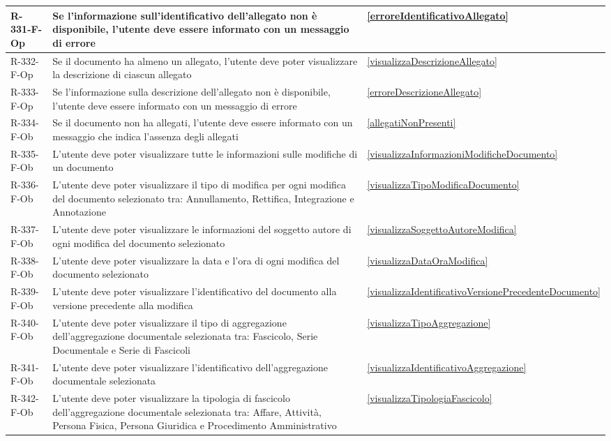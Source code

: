 \begin{longtable}{|p{2.5cm}|p{9.5cm}|p{2.5cm}|}
\hline
R-331-F-Op & Se l'informazione sull'identificativo dell'allegato non è disponibile, l'utente deve essere informato con un messaggio di errore & \ref{erroreIdentificativoAllegato} \\
\hline
R-332-F-Op & Se il documento ha almeno un allegato, l'utente deve poter visualizzare la descrizione di ciascun allegato & \ref{visualizzaDescrizioneAllegato} \\
\hline
R-333-F-Op & Se l'informazione sulla descrizione dell'allegato non è disponibile, l'utente deve essere informato con un messaggio di errore & \ref{erroreDescrizioneAllegato} \\
\hline
R-334-F-Ob & Se il documento non ha allegati, l'utente deve essere informato con un messaggio che indica l'assenza degli allegati & \ref{allegatiNonPresenti} \\
\hline
R-335-F-Ob & L'utente deve poter visualizzare tutte le informazioni sulle modifiche di un documento & \ref{visualizzaInformazioniModificheDocumento} \\
\hline
R-336-F-Ob & L'utente deve poter visualizzare il tipo di modifica per ogni modifica del documento selezionato tra: Annullamento, Rettifica, Integrazione e Annotazione & \ref{visualizzaTipoModificaDocumento} \\
\hline
R-337-F-Ob & L'utente deve poter visualizzare le informazioni del soggetto autore di ogni modifica del documento selezionato & \ref{visualizzaSoggettoAutoreModifica} \\
\hline
R-338-F-Ob & L'utente deve poter visualizzare la data e l'ora di ogni modifica del documento selezionato & \ref{visualizzaDataOraModifica} \\
\hline
R-339-F-Ob & L'utente deve poter visualizzare l'identificativo del documento alla versione precedente alla modifica & \ref{visualizzaIdentificativoVersionePrecedenteDocumento} \\
\hline
R-340-F-Ob & L'utente deve poter visualizzare il tipo di aggregazione dell'aggregazione documentale selezionata tra: Fascicolo, Serie Documentale e Serie di Fascicoli & \ref{visualizzaTipoAggregazione} \\
\hline
R-341-F-Ob & L'utente deve poter visualizzare l'identificativo dell'aggregazione documentale selezionata & \ref{visualizzaIdentificativoAggregazione} \\
\hline
R-342-F-Ob & L'utente deve poter visualizzare la tipologia di fascicolo dell'aggregazione documentale selezionata tra: Affare, Attività, Persona Fisica, Persona Giuridica e Procedimento Amministrativo & \ref{visualizzaTipologiaFascicolo} \\

\end{longtable}
